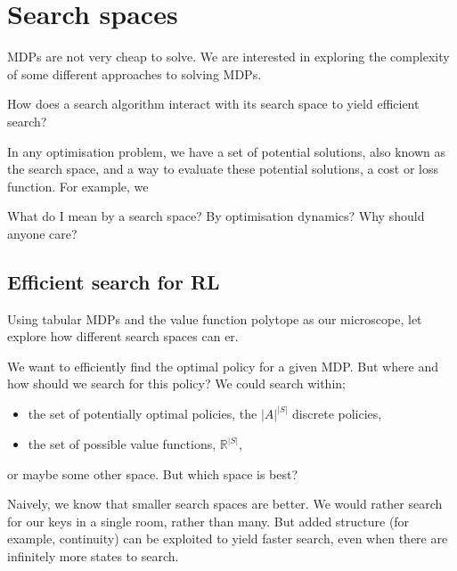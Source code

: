 \chapter{Search spaces}

MDPs are not very cheap to solve.
We are interested in exploring the complexity of some different approaches to solving MDPs.

\begin{displayquote}
How does a search algorithm interact with its search space to yield efficient search?
\end{displayquote}

In any optimisation problem, we have a set of potential solutions, also known as the search space,
and a way to evaluate these potential solutions, a cost or loss function. For example, we

What do I mean by a search space? By optimisation dynamics? Why should anyone care?


\section{Efficient search for RL}

Using tabular MDPs and the value function polytope as our microscope,
let explore how different search spaces can er.

We want to efficiently find the optimal policy for a given MDP. But where and how should we
search for this policy? We could search within;

\begin{itemize}
\tightlist
\item
the set of potentially optimal policies, the \(|A|^{|S|}\) discrete policies,
\item
the set of possible value functions, \(\mathbb R^{|S|}\),
\end{itemize}
or maybe some other space. But which space is best?

Naively, we know that smaller search spaces are better. We would rather
search for our keys in a single room, rather than many. But added
structure (for example, continuity) can be exploited to yield faster
search, even when there are infinitely more states to search.


